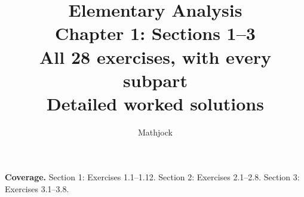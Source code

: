 
\title{\textbf{Elementary Analysis}\\[0.3em]
Chapter 1: Sections 1--3\\[0.4em]
\large All 28 exercises, with every subpart\\
Detailed worked solutions}
\author{Mathjock}
\date{}

\maketitle
\bookinfo
\par\textbf{Coverage.} Section 1: Exercises 1.1--1.12.
Section 2: Exercises 2.1--2.8.
Section 3: Exercises 3.1--3.8.
\tableofcontents
\clearpage

\clearpage

\clearpage


